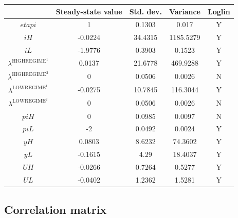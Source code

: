 \begin{tabular}{c|c|c|c|c|}
  & Steady-state value & Std. dev. & Variance & Loglin\\
\hline
${e\!t\!a\!p\!i}$ & 1 & 0.1303 & 0.017 & Y    \\
${i\!H}$ & -0.0224 & 34.4315 & 1185.5279 & Y    \\
${i\!L}$ & -1.9776 & 0.3903 & 0.1523 & Y    \\
$\lambda^{\mathrm{HIGHREGIME}^{\mathrm{1}}}$ & 0.0137 & 21.6778 & 469.9288 & Y    \\
$\lambda^{\mathrm{HIGHREGIME}^{\mathrm{2}}}$ & 0 & 0.0506 & 0.0026 & N    \\
$\lambda^{\mathrm{LOWREGIME}^{\mathrm{1}}}$ & -0.0275 & 10.7845 & 116.3044 & Y    \\
$\lambda^{\mathrm{LOWREGIME}^{\mathrm{2}}}$ & 0 & 0.0506 & 0.0026 & N    \\
${p\!i\!H}$ & 0 & 0.0985 & 0.0097 & N    \\
${p\!i\!L}$ & -2 & 0.0492 & 0.0024 & Y    \\
${y\!H}$ & 0.0803 & 8.6232 & 74.3602 & Y    \\
${y\!L}$ & -0.1615 & 4.29 & 18.4037 & Y    \\
${U\!H}$ & -0.0266 & 0.7264 & 0.5277 & Y    \\
${U\!L}$ & -0.0402 & 1.2362 & 1.5281 & Y    \\
\hline
\end{tabular}


\subsection{Correlation matrix}

